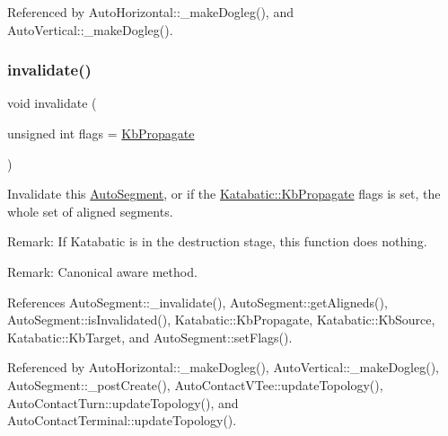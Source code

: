 Referenced by Auto\+Horizontal\+::\+\_\+make\+Dogleg(), and Auto\+Vertical\+::\+\_\+make\+Dogleg().

\mbox{\label{classKatabatic_1_1AutoSegment_a23599eee5a07af377fbc8d47cda7e7b0}} 
\subsubsection{\texorpdfstring{invalidate()}{invalidate()}}
{\footnotesize\ttfamily void invalidate (\begin{DoxyParamCaption}\item[{unsigned int}]{flags = {\ttfamily \mbox{\hyperlink{namespaceKatabatic_a2af2ad6b6441614038caf59d04b3b217a3f95c1f06fe0b58b44ccbc57d99f2a5d}{Kb\+Propagate}}} }\end{DoxyParamCaption})\hspace{0.3cm}{\ttfamily [virtual]}}

Invalidate this \mbox{\hyperlink{classKatabatic_1_1AutoSegment}{Auto\+Segment}}, or if the \mbox{\hyperlink{namespaceKatabatic_a2af2ad6b6441614038caf59d04b3b217a3f95c1f06fe0b58b44ccbc57d99f2a5d}{Katabatic\+::\+Kb\+Propagate}} flags is set, the whole set of aligned segments.

\begin{DoxyParagraph}{Remark\+: If Katabatic is in the destruction stage, this function does nothing.}

\end{DoxyParagraph}
\begin{DoxyParagraph}{Remark\+: Canonical aware method. }

\end{DoxyParagraph}


References Auto\+Segment\+::\+\_\+invalidate(), Auto\+Segment\+::get\+Aligneds(), Auto\+Segment\+::is\+Invalidated(), Katabatic\+::\+Kb\+Propagate, Katabatic\+::\+Kb\+Source, Katabatic\+::\+Kb\+Target, and Auto\+Segment\+::set\+Flags().



Referenced by Auto\+Horizontal\+::\+\_\+make\+Dogleg(), Auto\+Vertical\+::\+\_\+make\+Dogleg(), Auto\+Segment\+::\+\_\+post\+Create(), Auto\+Contact\+V\+Tee\+::update\+Topology(), Auto\+Contact\+Turn\+::update\+Topology(), and Auto\+Contact\+Terminal\+::update\+Topology().

